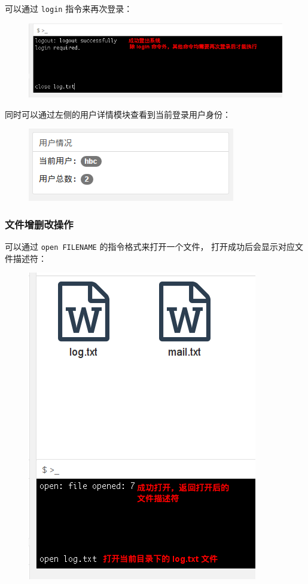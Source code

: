 \documentclass[12bp]{guo}
\begin{document}
可以通过 \texttt{login} 指令来再次登录：

\begin{figure}[h!]
    \centering
        \includegraphics[scale=0.7]{figures/fs-app.logout.png}
\end{figure}


同时可以通过左侧的用户详情模块查看到当前登录用户身份：

\begin{figure}[h!]
    \centering
        \includegraphics[scale=0.7]{figures/fs-app.user-stats.png}
\end{figure}

\clearpage

\subsubsection{文件增删改操作}

可以通过 \texttt{open FILENAME} 的指令格式来打开一个文件，
打开成功后会显示对应文件描述符：

\begin{figure}[h!]
    \centering
        \includegraphics[scale=0.75]{figures/fs-app.open.png}
\end{figure}
\end{document}
